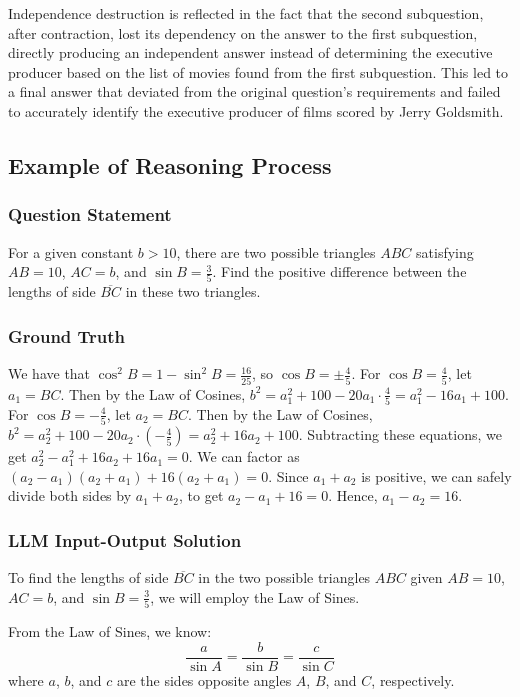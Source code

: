 Independence destruction is reflected in the fact that the second subquestion, after contraction, lost its dependency on the answer to the first subquestion, directly producing an independent answer instead of determining the executive producer based on the list of movies found from the first subquestion. This led to a final answer that deviated from the original question's requirements and failed to accurately identify the executive producer of films scored by Jerry Goldsmith.

\subsection{Example of \our Reasoning Process}
\label{appendix:example}
\subsubsection*{Question Statement}
For a given constant $b > 10$, there are two possible triangles $ABC$ satisfying $AB = 10$, $AC = b$, and $\sin B = \frac{3}{5}$. Find the positive difference between the lengths of side $\overline{BC}$ in these two triangles.
\subsubsection*{Ground Truth}
We have that $\cos^2 B = 1 - \sin^2 B = \frac{16}{25}$, so $\cos B = \pm \frac{4}{5}$. For $\cos B = \frac{4}{5}$, let $a_1 = BC$. Then by the Law of Cosines, $b^2 = a_1^2 + 100 - 20a_1 \cdot \frac{4}{5} = a_1^2 - 16a_1 + 100$. For $\cos B = -\frac{4}{5}$, let $a_2 = BC$. Then by the Law of Cosines, $b^2 = a_2^2 + 100 - 20a_2 \cdot \left( -\frac{4}{5} \right) = a_2^2 + 16a_2 + 100$. Subtracting these equations, we get $a_2^2 - a_1^2 + 16a_2 + 16a_1 = 0$. We can factor as $(a_2 - a_1)(a_2 + a_1) + 16(a_2 + a_1) = 0$. Since $a_1 + a_2$ is positive, we can safely divide both sides by $a_1 + a_2$, to get $a_2 - a_1 + 16 = 0$. Hence, $a_1 - a_2 = \boxed{16}$.
\subsubsection*{LLM Input-Output Solution}
To find the lengths of side $\overline{BC}$ in the two possible triangles $ABC$ given $AB = 10$, $AC = b$, and $\sin B = \frac{3}{5}$, we will employ the Law of Sines.

From the Law of Sines, we know:
$$\frac{a}{\sin A} = \frac{b}{\sin B} = \frac{c}{\sin C}$$
where $a$, $b$, and $c$ are the sides opposite angles $A$, $B$, and $C$, respectively.

